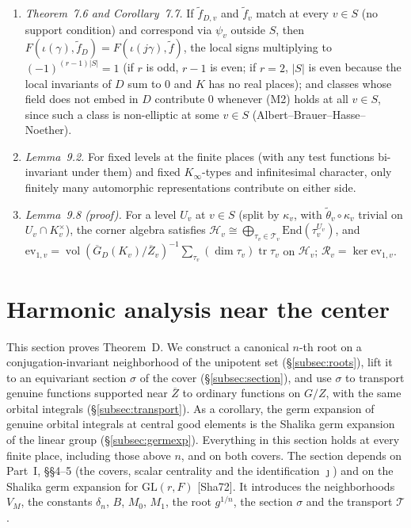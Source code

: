 \documentclass[12pt]{article}
\newcommand{\ov}[1]{\overline{#1}}
\newcommand{\tr}{\operatorname{tr}}
\newcommand{\vol}{\operatorname{vol}}
\newcommand{\GL}{\mathrm{GL}}
\newcommand{\Zb}{\ov{Z}}
\newcommand{\GDb}{\ov{G}_D}
\newcommand{\jj}{\jmath}
\newcommand{\sg}{\sigma}
\theoremstyle{plain}
\theoremstyle{definition}
\begin{document}
\begin{enumerate}[label=(I\arabic*)]
\item \emph{Theorem~7.6 and Corollary~7.7.} If $\tilde f_{D,v}$ and $\tilde f_v$ match at every $v\in S$ (no support condition) and correspond via $\psi_v$ outside $S$, then $F(\iota(\gamma),\tilde f_D)=F(\iota(j\gamma),\tilde f)$, the local signs multiplying to $(-1)^{(r-1)|S|}=1$ (if $r$ is odd, $r-1$ is even; if $r=2$, $|S|$ is even because the local invariants of $D$ sum to $0$ and $K$ has no real places); and classes whose field does not embed in $D$ contribute $0$ whenever (M2) holds at all $v\in S$, since such a class is non-elliptic at some $v\in S$ (Albert--Brauer--Hasse--Noether).
\item \emph{Lemma~9.2.} For fixed levels at the finite places (with any test functions bi-invariant under them) and fixed $K_\infty$-types and infinitesimal character, only finitely many automorphic representations contribute on either side.
\item \emph{Lemma~9.8 (proof).} For a level $U_v$ at $v\in S$ (split by $\kappa_v$, with $\tilde\theta_v\circ\kappa_v$ trivial on $U_v\cap K_v^\times$), the corner algebra satisfies $\mathcal H_v\cong\bigoplus_{\tau_v\in\mathcal T_v}\mathrm{End}(\tau_v^{U_v})$, and $\mathrm{ev}_{1,v}=\vol(\GDb(K_v)/\Zb_v)^{-1}\sum_{\tau_v}(\dim\tau_v)\tr\tau_v$ on $\mathcal H_v$; $\mathcal R_v=\ker\mathrm{ev}_{1,v}$.
\end{enumerate}

\section{Harmonic analysis near the center}\label{sec:center}
This section proves Theorem~D. We construct a canonical $n$-th root on a conjugation-invariant neighborhood of the unipotent set (\S\ref{subsec:roots}), lift it to an equivariant section $\sg$ of the cover (\S\ref{subsec:section}), and use $\sg$ to transport genuine functions supported near $\Zb$ to ordinary functions on $G/Z$, with the same orbital integrals (\S\ref{subsec:transport}). As a corollary, the germ expansion of genuine orbital integrals at central good elements is the Shalika germ expansion of the linear group (\S\ref{subsec:germexp}). Everything in this section holds at every finite place, including those above $n$, and on both covers. The section depends on Part~I, \S\S4--5 (the covers, scalar centrality and the identification $\jj$) and on the Shalika germ expansion for $\GL(r,F)$ [Sha72]. It introduces the neighborhoods $V_M$, the constants $\delta_n$, $B$, $M_0$, $M_1$, the root $g^{1/n}$, the section $\sg$ and the transport $\mathcal T$.
\end{document}
